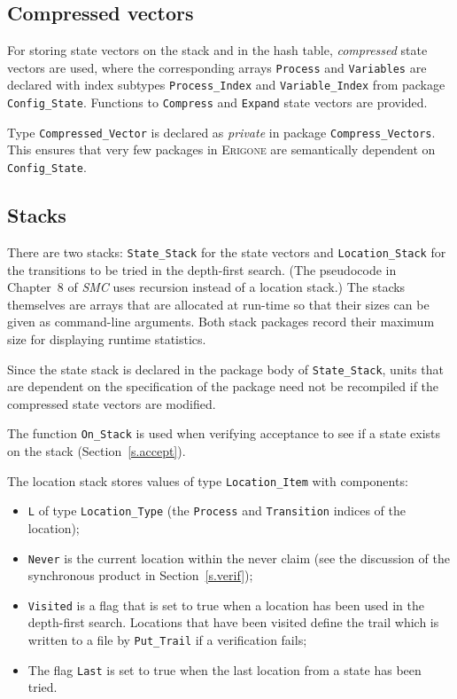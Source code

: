 \documentclass[11pt]{article}
\newcommand*{\prg}{\textsc{Erigone}}
\newcommand*{\smc}{\textit{SMC}}
\newcommand*{\p}[1]{\texttt{#1}}
\begin{document}
\subsection{Compressed vectors}

For storing state vectors on the stack and in the hash table,
\emph{compressed} state vectors are used, where the corresponding arrays
\p{Process} and \p{Variables} are declared with index subtypes
\p{Process\_Index} and \p{Variable\_Index} from package
\p{Config\_State}. Functions to \p{Compress} and \p{Expand} state
vectors are provided.

Type \p{Compressed\_Vector} is declared as \emph{private} in package
\p{Compress\_Vectors}. This ensures that very few packages in \prg{} are
semantically dependent on \p{Config\_State}.

\subsection{Stacks}
There are two stacks: \p{State\_Stack} for the state vectors and
\p{Location\_Stack} for the transitions to be tried in the depth-first
search. (The pseudocode in Chapter~8 of \smc{} uses
recursion instead of a location stack.) The stacks themselves are arrays
that are allocated at run-time so that their sizes can be given as
command-line arguments. Both stack packages record their maximum size
for displaying runtime statistics.

Since the state stack is declared in the package body of
\p{State\_Stack}, units that are dependent on the specification of the
package need not be recompiled if the compressed state vectors are
modified.

The function \p{On\_Stack} is used when verifying acceptance to see if a
state exists on the stack (Section~\ref{s.accept}).

The location stack stores values of type \p{Location\_Item} with
components:
\begin{itemize}
\item \p{L} of type \p{Location\_Type} (the \p{Process} and
\p{Transition} indices of the location);
\item \p{Never} is the current location within the never claim (see the discussion
of the synchronous product in Section~\ref{s.verif});
\item \p{Visited} is a flag that is set to true when a location has been
used in the depth-first search. Locations that have been visited define
the trail which is written to a file by \p{Put\_Trail} if a verification
fails;
\item The flag \p{Last} is set to true when the last location from a
state has been tried.
\end{itemize}
\end{document}
